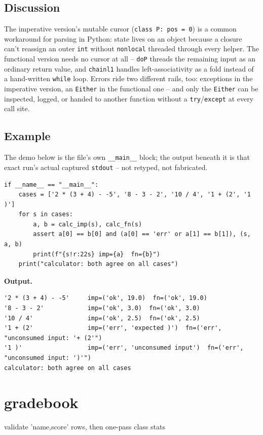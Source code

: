 \documentclass[10pt,letterpaper]{book}
\begin{document}
\section*{Discussion}

The imperative version's mutable cursor (\texttt{class P: pos = 0}) is a
common workaround for parsing in Python: state lives on an object because
a closure can't reassign an outer \texttt{int} without \texttt{nonlocal}
threaded through every helper. The functional version needs no cursor at
all -- \texttt{doP} threads the remaining input as an ordinary return
value, and \texttt{chainl1} handles left-associativity as a fold instead
of a hand-written \texttt{while} loop. Errors ride two different rails,
too: exceptions in the imperative version, an \texttt{Either} in the
functional one -- and only the \texttt{Either} can be inspected, logged,
or handed to another function without a \texttt{try}/\texttt{except} at
every call site.

\section*{Example}
The demo below is the file's own \texttt{\_\_main\_\_} block; the output beneath it is that exact run's actual captured \texttt{stdout} -- not retyped, not fabricated.
\begin{lstlisting}[style=code]
if __name__ == "__main__":
    cases = ['2 * (3 + 4) - -5', '8 - 3 - 2', '10 / 4', '1 + (2', '1 )']
    for s in cases:
        a, b = calc_imp(s), calc_fn(s)
        assert a[0] == b[0] and (a[0] == 'err' or a[1] == b[1]), (s, a, b)
        print(f"{s!r:22s} imp={a}  fn={b}")
    print("calculator: both agree on all cases")
\end{lstlisting}
\noindent\textbf{Output.}
\begin{lstlisting}[style=ex]
'2 * (3 + 4) - -5'     imp=('ok', 19.0)  fn=('ok', 19.0)
'8 - 3 - 2'            imp=('ok', 3.0)  fn=('ok', 3.0)
'10 / 4'               imp=('ok', 2.5)  fn=('ok', 2.5)
'1 + (2'               imp=('err', 'expected )')  fn=('err', "unconsumed input: '+ (2'")
'1 )'                  imp=('err', 'unconsumed input')  fn=('err', "unconsumed input: ')'")
calculator: both agree on all cases
\end{lstlisting}
\chapter{gradebook}
validate 'name,score' rows, then one-pass class stats
\end{document}
